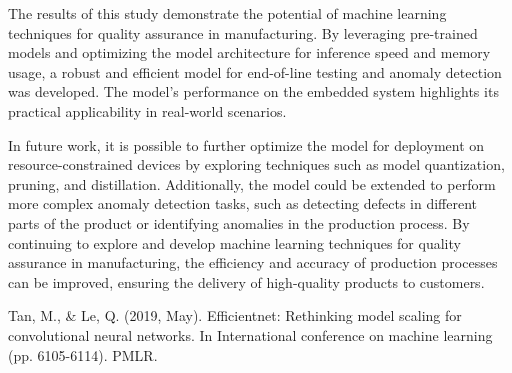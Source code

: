 \documentclass[lettersize,journal]{IEEEtran}
\begin{document}
The results of this study demonstrate the potential of machine learning techniques for quality assurance in manufacturing. By leveraging pre-trained models and optimizing the model architecture for inference speed and memory usage, a robust and efficient model for end-of-line testing and anomaly detection was developed. The model's performance on the embedded system highlights its practical applicability in real-world scenarios.

In future work, it is possible to further optimize the model for deployment on resource-constrained devices by exploring techniques such as model quantization, pruning, and distillation. Additionally, the model could be extended to perform more complex anomaly detection tasks, such as detecting defects in different parts of the product or identifying anomalies in the production process. By continuing to explore and develop machine learning techniques for quality assurance in manufacturing, the efficiency and accuracy of production processes can be improved, ensuring the delivery of high-quality products to customers.

\begin{thebibliography}{1}




Tan, M., \& Le, Q. (2019, May). Efficientnet: Rethinking model scaling for convolutional neural networks. In International conference on machine learning (pp. 6105-6114). PMLR.

\end{thebibliography}

\vfill
\end{document}
